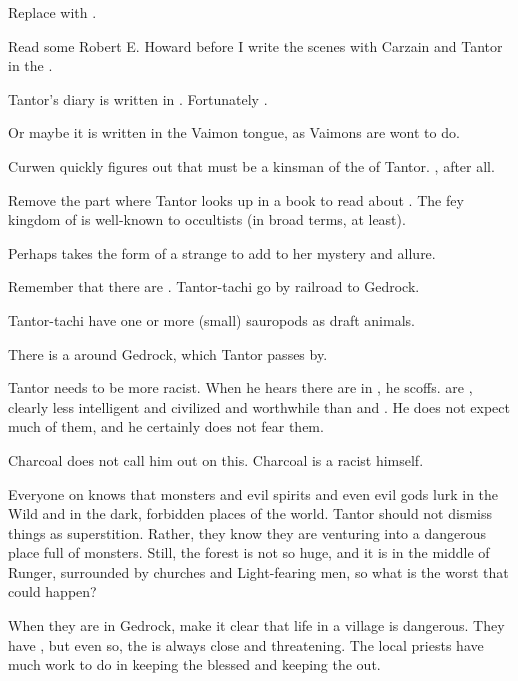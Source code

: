 \begin{changes}
    Replace  with . 
    
    Read some Robert E. Howard before I write the scenes with Carzain and Tantor in the \wylde. 
    
    Tantor's diary is written in .
    Fortunately .
    
    Or maybe it is written in the Vaimon tongue, as Vaimons are wont to do.
    
    Curwen quickly figures out that  must be a kinsman of the \scarv{} of Tantor. 
    , after all.
    
    Remove the part where Tantor looks up in a book to read about \EreshKal.
    The fey kingdom of \EreshKal is well-known to occultists (in broad terms, at least).
    
    Perhaps \Takestsha takes the form of a strange  to add to her mystery and allure.
    
    Remember that there are . 
    Tantor-tachi go by railroad to Gedrock. 
    
    Tantor-tachi have one or more (small) sauropods as draft animals. 
    
    There is a  around Gedrock, which Tantor passes by. 
    
    Tantor needs to be more racist. 
    When he hears there are \meccara{} in \EreshKal, he scoffs. 
    \Meccara{} are , clearly less intelligent and civilized and worthwhile than \humans{} and \scathae. 
    He does not expect much of them, and he certainly does not fear them. 
    
    Charcoal does not call him out on this. 
    Charcoal is a racist himself.

    Everyone on \Azmith knows that monsters and evil spirits and even evil gods lurk in the Wild and in the dark, forbidden places of the world.
    \Jirad Tantor should not dismiss things as superstition.
    Rather, they know they are venturing into a dangerous place full of monsters.
    Still, the forest is not so huge, and it is in the middle of Runger, surrounded by churches and Light-fearing men, so what is the worst that could happen?
    
    When they are in Gedrock, make it clear that life in a village is dangerous. 
    They have \eidola, but even so, the \wylde is always close and threatening.
    The local priests have much work to do in keeping the \eidola blessed and keeping the \wylde out. 


\end{changes}

